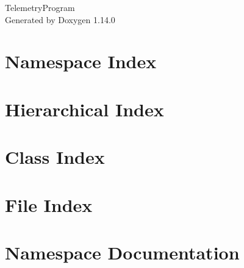 \documentclass[twoside]{book}
\newcommand{\+}{\discretionary{\mbox{\scriptsize$\hookleftarrow$}}{}{}}
\newcommand{\clearemptydoublepage}{%
    \newpage{\pagestyle{empty}\cleardoublepage}%
  }
\begin{document}
  \raggedbottom
    \hypersetup{pageanchor=false,
                bookmarksnumbered=true,
                pdfencoding=unicode
               }
  \begin{titlepage}
  \vspace*{7cm}
  \begin{center}%
  {\Large Telemetry\+Program}\\
  \vspace*{1cm}
  {\large Generated by Doxygen 1.14.0}\\
  \end{center}
  \end{titlepage}
  \clearemptydoublepage
  \tableofcontents
  \clearemptydoublepage
  \hypersetup{pageanchor=true}
\chapter{Namespace Index}

\chapter{Hierarchical Index}

\chapter{Class Index}

\chapter{File Index}

\chapter{Namespace Documentation}






\end{document}

